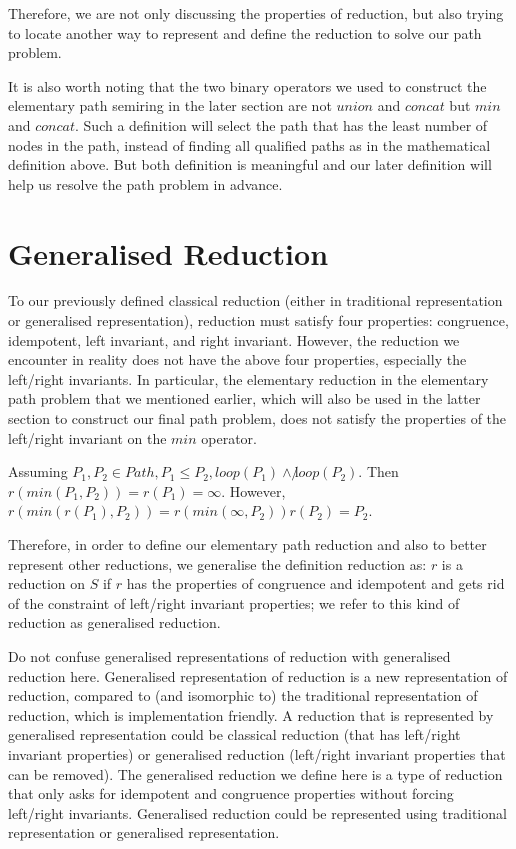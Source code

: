 \documentclass[a4paper,12pt,twoside,openright]{report}
\begin{document}
Therefore, we are not only discussing the properties of reduction, but also trying to locate another way to represent and define the reduction to solve our path problem.

It is also worth noting that the two binary operators we used to construct the elementary path semiring in the later section are not $union$ and $concat$ but $min$ and $concat$. 
Such a definition will select the path that has the least number of nodes in the path, instead of finding all qualified paths as in the mathematical definition above. But both definition is meaningful and our later definition will help us resolve the path problem in advance.

\section{Generalised Reduction}
To our previously defined classical reduction (either in traditional representation or generalised representation), reduction must satisfy four properties: congruence, idempotent, left invariant, and right invariant. However, the reduction we encounter in reality does not have the above four properties, especially the left/right invariants. In particular, the elementary reduction in the elementary path problem that we mentioned earlier, which will also be used in the latter section to construct our final path problem, does not satisfy the properties of the left/right invariant on the $min$ operator. 

Assuming $P_1,P_2 \in Path, P_1 \leq P_2, loop(P_1) \wedge \not loop(P_2)$. 
Then $r(min(P_1,P_2)) = r(P_1) = \infty$.
However, $r(min(r(P_1),P_2)) = r(min(\infty,P_2)) r(P_2) = P_2$. 

Therefore, in order to define our elementary path reduction and also to better represent other reductions, we generalise the definition reduction as: $r$ is a reduction on $S$ if $r$ has the properties of congruence and idempotent and gets rid of the constraint of left/right invariant properties; we refer to this kind of reduction as generalised reduction.

Do not confuse generalised representations of reduction with generalised reduction here. 
Generalised representation of reduction is a new representation of reduction, compared to (and isomorphic to) the traditional representation of reduction, which is implementation friendly.  A reduction that is represented by generalised representation could be classical reduction (that has left/right invariant properties) or generalised reduction (left/right invariant properties that can be removed).
The generalised reduction we define here is a type of reduction that only asks for idempotent and congruence properties without forcing left/right invariants.  Generalised reduction could be represented using traditional representation or generalised representation.
\end{document}
